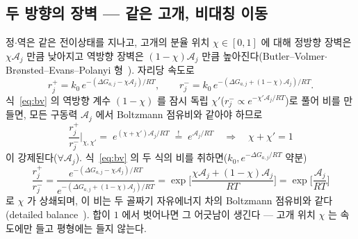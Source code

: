 \documentclass[11pt,a4paper]{article}
\begin{document}
\subsection{두 방향의 장벽 — 같은 고개, 비대칭 이동}
정$\cdot$역은 같은 전이상태를 지나고, 고개의 분율 위치 $\chi\in[0,1]$ 에 대해 정방향 장벽은 $\chi\mathcal A_j$ 만큼 낮아지고 역방향 장벽은 $(1-\chi)\mathcal A_j$ 만큼 높아진다(Butler--Volmer$\cdot$Br\o nsted--Evans--Polanyi 형~\cite{bardfaulkner,evanspolanyi1938}). 자리당 속도로
\begin{equation}
r_j^+=k_0\,e^{-(\Delta G_{a,j}-\chi\mathcal A_j)/RT},\qquad
r_j^-=k_0\,e^{-(\Delta G_{a,j}+(1-\chi)\mathcal A_j)/RT}.
\label{eq:bv}
\end{equation}
식~\eqref{eq:bv} 의 역방향 계수 $(1-\chi)$ 를 잠시 독립 $\chi'$($r_j^-\propto e^{-\chi'\mathcal A_j/RT}$)로 풀어 비를 만들면, 모든 구동력 $\mathcal A_j$ 에서 Boltzmann 점유비와 같아야 하므로
\begin{equation}
\frac{r_j^+}{r_j^-}\bigg|_{\chi,\chi'}
=\;e^{(\chi+\chi')\mathcal A_j/RT}
\;\overset{!}{=}\;e^{\mathcal A_j/RT}
\quad\Longrightarrow\quad
\chi+\chi'=1
\label{eq:chisum}
\end{equation}
이 강제된다($\forall\mathcal A_j$). 식~\eqref{eq:bv} 의 두 식의 비를 취하면($k_0,e^{-\Delta G_{a,j}/RT}$ 약분)
\begin{equation}
\frac{r_j^+}{r_j^-}
=\frac{e^{-(\Delta G_{a,j}-\chi\mathcal A_j)/RT}}{e^{-(\Delta G_{a,j}+(1-\chi)\mathcal A_j)/RT}}
=\exp\!\Big[\frac{\chi\mathcal A_j+(1-\chi)\mathcal A_j}{RT}\Big]
=\exp\!\Big[\frac{\mathcal A_j}{RT}\Big]
\label{eq:db}
\end{equation}
로 $\chi$ 가 상쇄되며, 이 비는 두 골짜기 자유에너지 차의 Boltzmann 점유비와 같다(detailed balance~\cite{bazant2013}). 합이 $1$ 에서 벗어나면 그 어긋남이 생긴다 — 고개 위치 $\chi$ 는 속도에만 들고 평형에는 들지 않는다.
\end{document}

